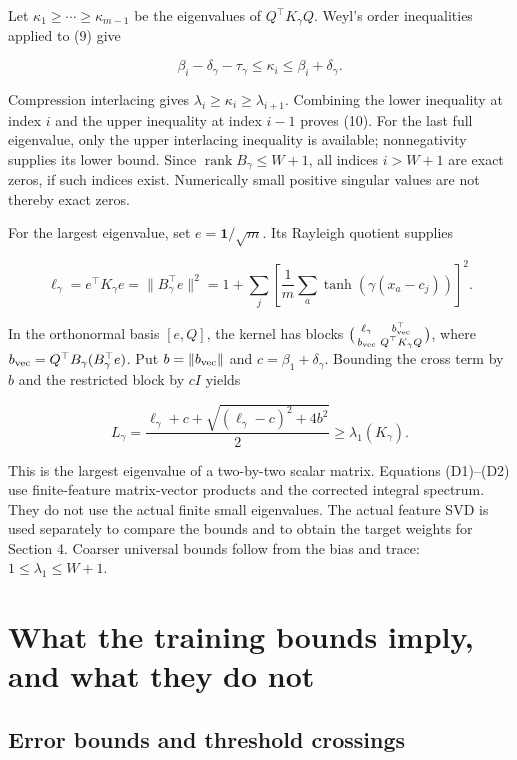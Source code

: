 \documentclass[11pt]{article}
\begin{document}
Let \(\kappa_1\ge\cdots\ge\kappa_{m-1}\) be the eigenvalues of \(Q^\top K_\gamma Q\). Weyl's order inequalities applied to (9) give

\[
\beta_i-\delta_\gamma-\tau_\gamma\le\kappa_i\le\beta_i+\delta_\gamma.
\]

Compression interlacing gives \(\lambda_i\ge\kappa_i\ge\lambda_{i+1}\). Combining the lower inequality at index \(i\) and the upper inequality at index \(i-1\) proves (10). For the last full eigenvalue, only the upper interlacing inequality is available; nonnegativity supplies its lower bound. Since \(\operatorname{rank}B_\gamma\le W+1\), all indices \(i>W+1\) are exact zeros, if such indices exist. Numerically small positive singular values are not thereby exact zeros.

For the largest eigenvalue, set \(e=\mathbf1/\sqrt m\). Its Rayleigh quotient supplies

\[
\ell_\gamma=e^\top K_\gamma e
=\|B_\gamma^\top e\|^2
=1+\sum_j\left[\frac1m\sum_a\tanh(\gamma(x_a-c_j))\right]^2.
\tag{D1}
\]

In the orthonormal basis \([e,Q]\), the kernel has blocks \(\bigl(\begin{smallmatrix}\ell_\gamma&b_{\rm vec}^\top\\b_{\rm vec}&Q^\top K_\gamma Q\end{smallmatrix}\bigr)\), where \(b_{\rm vec}=Q^\top B_\gamma(B_\gamma^\top e)\). Put \(b=\|b_{\rm vec}\|\) and \(c=\beta_1+\delta_\gamma\). Bounding the cross term by \(b\) and the restricted block by \(cI\) yields

\[
L_\gamma=
\frac{\ell_\gamma+c+\sqrt{(\ell_\gamma-c)^2+4b^2}}2
\ge\lambda_1(K_\gamma).
\tag{D2}
\]

This is the largest eigenvalue of a two-by-two scalar matrix. Equations (D1)--(D2) use finite-feature matrix-vector products and the corrected integral spectrum. They do not use the actual finite small eigenvalues. The actual feature SVD is used separately to compare the bounds and to obtain the target weights for Section 4. Coarser universal bounds follow from the bias and trace: \(1\le\lambda_1\le W+1\).

\section{What the training bounds imply, and what they do not}

\subsection{Error bounds and threshold crossings}
\end{document}
